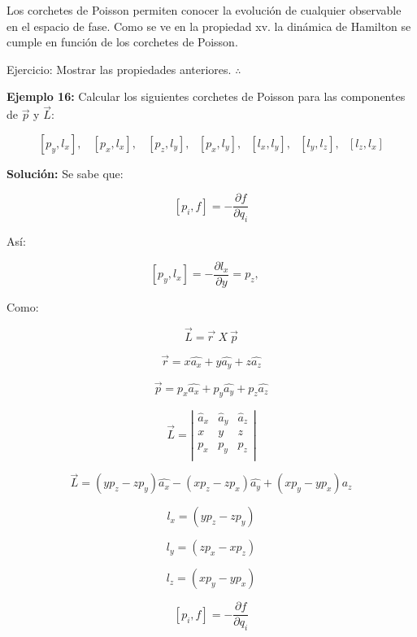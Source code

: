 \documentclass[]{article}
\begin{document}
Los corchetes de Poisson permiten conocer la evolución de cualquier
observable en el espacio de fase. Como se ve en la propiedad xv. la
dinámica de Hamilton se cumple en función de los corchetes de Poisson.

Ejercicio: Mostrar las propiedades anteriores. \(\therefore\)

\textbf{Ejemplo 16:} Calcular los siguientes corchetes de Poisson para
las componentes de \(\overrightarrow{p}\) y \(\overrightarrow{L}\):

\[\left\lbrack p_{y},l_{x} \right\rbrack,\ \ \ \ \left\lbrack p_{x},l_{x} \right\rbrack,\ \ \ \ \left\lbrack p_{z},l_{y} \right\rbrack,\ \ \ \left\lbrack p_{x},l_{y} \right\rbrack,\ \ \ \left\lbrack l_{x},l_{y} \right\rbrack,\ \ \ \left\lbrack l_{y},l_{z} \right\rbrack,\ \ \ \left\lbrack l_{z},l_{x} \right\rbrack\]

\textbf{Solución:} Se sabe que:

\[\left\lbrack p_{i},f \right\rbrack = - \frac{\partial f}{\partial q_{i}}\]

Así:

\[\left\lbrack p_{y},l_{x} \right\rbrack = - \frac{\partial l_{x}}{\partial y} = p_{z},\ \ \ \ \ \]

Como:

\[\overrightarrow{L} = \overrightarrow{r\ }\ X\ \overrightarrow{p}\]

\[\overrightarrow{r} = x\widehat{a_{x}} + y\widehat{a_{y}} + z\widehat{a_{z}}\]

\[\overrightarrow{p} = p_{x}\widehat{a_{x}} + p_{y}\widehat{a_{y}} + p_{z}\widehat{a_{z}}\]

\[\overrightarrow{L} = \left| \begin{matrix}
{\widehat{a}}_{x} & {\widehat{a}}_{y} & {\widehat{a}}_{z} \\
x & y & z \\
p_{x} & p_{y} & p_{z} \\
\end{matrix} \right|\]

\[\overrightarrow{L} = \left( yp_{z} - zp_{y} \right)\widehat{a_{x}} - \left( xp_{z} - zp_{x} \right)\widehat{a_{y}} + \left( xp_{y} - yp_{x} \right)\widehat{a_{z}}\]

\[l_{x} = \left( yp_{z} - zp_{y} \right)\]

\[l_{y} = \left( zp_{x} - xp_{z} \right)\]

\[l_{z} = \left( xp_{y} - yp_{x} \right)\]

\[\left\lbrack p_{i},f \right\rbrack = - \frac{\partial f}{\partial q_{i}}\]
\end{document}
